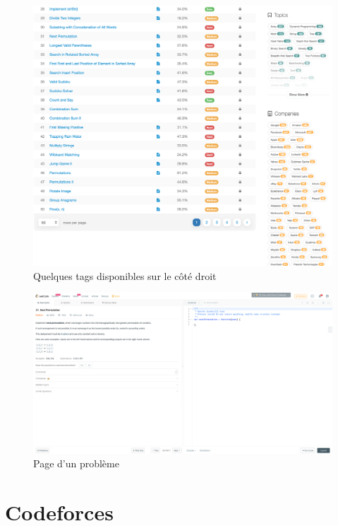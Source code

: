 \begin{figure}[H]
    \includegraphics[width=\textwidth,height=0.6\textheight,keepaspectratio]{images/comparison/leetcode-2.png}
    \centering
    \caption[Leetcode : quelques \glspl{tag} disponibles sur le côté droit]{Quelques \glspl{tag} disponibles sur le côté droit}
\end{figure}

\begin{figure}[H]
    \includegraphics[width=\textwidth,height=0.30\textheight,keepaspectratio]{images/comparison/leetcode-3.png}
    \centering
    \caption[Leetcode : page d'un problème]{Page d'un problème}
\end{figure}


\section{Codeforces}

